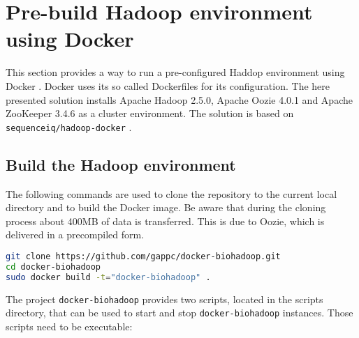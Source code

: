 % 
% 
% 

\section{Pre-build Hadoop environment using Docker}
\label{chap:appendix:biohadoop-docker}
This section provides a way to run a pre-configured Haddop environment using Docker \cite{docker}. Docker uses its so called Dockerfiles for its configuration. The here presented solution installs Apache Hadoop 2.5.0, Apache Oozie 4.0.1 and Apache ZooKeeper 3.4.6 as a cluster environment. The solution is based on \texttt{sequenceiq/hadoop-docker} \cite{docker-sequenceiq}.

\subsection{Build the Hadoop environment}
The following commands are used to clone the repository to the current local directory and to build the Docker image. Be aware that during the cloning process about 400MB of data is transferred. This is due to Oozie, which is delivered in a precompiled form.
\begin{lstlisting}[language=bash]
git clone https://github.com/gappc/docker-biohadoop.git
cd docker-biohadoop
sudo docker build -t="docker-biohadoop" .
\end{lstlisting}

The project \texttt{docker-biohadoop} provides two scripts, located in the scripts directory, that can be used to start and stop \texttt{docker-biohadoop} instances. Those scripts need to be executable:

